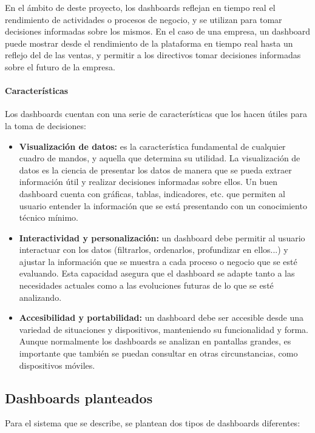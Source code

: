 En el ámbito de deste proyecto, los dashboards reflejan en tiempo real el rendimiento de
actividades o procesos de negocio, y se utilizan para tomar decisiones informadas sobre los
mismos. En el caso de una empresa, un dashboard puede mostrar desde el rendimiento de la
plataforma en tiempo real hasta un reflejo del de las ventas, y permitir a los directivos tomar
decisiones informadas sobre el futuro de la empresa.

\paragraph{Características}
Los dashboards cuentan con una serie de características que los hacen útiles para la toma de
decisiones:~\cite{mier2023dashboards}

\begin{itemize}
	\item \textbf{Visualización de datos:} es la característica fundamental de cualquier
		cuadro de mandos, y aquella que determina su utilidad. La visualización de datos
		es la ciencia de presentar los datos de manera que se pueda extraer información útil
		y realizar decisiones informadas sobre ellos. Un buen dashboard cuenta con gráficas,
		tablas, indicadores, etc. que permiten al usuario entender la información que se
		está presentando con un conocimiento técnico mínimo.
	\item \textbf{Interactividad y personalización:} un dashboard debe permitir al usuario
		interactuar con los datos (filtrarlos, ordenarlos, profundizar en ellos...) y ajustar
		la información que se muestra a cada proceso o negocio que se esté evaluando.
		Esta capacidad asegura que el dashboard se adapte tanto a las necesidades actuales
		como a las evoluciones futuras de lo que se esté analizando.
	\item \textbf{Accesibilidad y portabilidad:} un dashboard debe ser accesible desde una
		variedad de situaciones y dispositivos, manteniendo su funcionalidad y forma. Aunque
		normalmente los dashboards se analizan en pantallas grandes, es importante que también
		se puedan consultar en otras circunstancias, como dispositivos móviles.
\end{itemize}

\newpage{}
\subsection{Dashboards planteados}
Para el sistema que se describe, se plantean dos tipos de dashboards diferentes:

